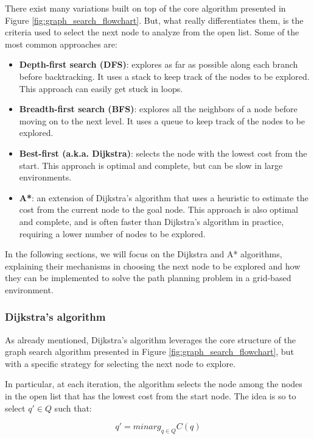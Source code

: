 There exist many variations built on top of the core algorithm presented in Figure \ref{fig:graph_search_flowchart}.
But, what really differentiates them, is the criteria used to select the next node to analyze from the open list.
Some of the most common approaches are:

\begin{itemize}
    \item \textbf{Depth-first search (DFS)}: explores as far as possible along each branch before backtracking. It uses a stack to keep track of the nodes to be explored. This approach can easily get stuck in loops.
    \item \textbf{Breadth-first search (BFS)}: explores all the neighbors of a node before moving on to the next level. It uses a queue to keep track of the nodes to be explored.
    \item \textbf{Best-first (a.k.a. Dijkstra)}: selects the node with the lowest cost from the start. This approach is optimal and complete, but can be slow in large environments.
    \item \textbf{A*}: an extension of Dijkstra's algorithm that uses a heuristic to estimate the cost from the current node to the goal node. This approach is also optimal and complete, and is often faster than Dijkstra's algorithm in practice, requiring a lower number of nodes to be explored.
\end{itemize}

In the following sections, we will focus on the Dijkstra and A* algorithms, explaining their mechanisms in choosing the next node to be explored and how they can be implemented to solve the path planning problem in a grid-based environment.



\subsubsection{Dijkstra's algorithm}
\label{sec:dijkstra_algorithm}

As already mentioned, Dijkstra's algorithm leverages the core structure of the graph search algorithm presented in Figure \ref{fig:graph_search_flowchart}, but with a specific strategy for selecting the next node to explore.

In particular, at each iteration, the algorithm selects the node among the nodes in the open list that has the lowest cost from the start node.
The idea is so to select $q' \in Q$ such that:

\begin{equation}
    q' = minarg_{q \in Q} C(q)
\end{equation}

